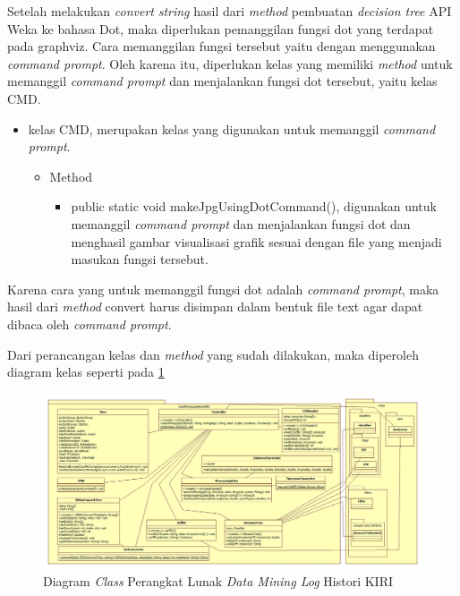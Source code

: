 Setelah melakukan \textsl{convert} \textsl{string} hasil dari \textsl{method} pembuatan \textsl{decision tree} API Weka ke bahasa Dot, maka diperlukan pemanggilan fungsi dot yang terdapat pada graphviz. Cara memanggilan fungsi tersebut yaitu dengan menggunakan \textsl{command prompt}. Oleh karena itu, diperlukan kelas yang memiliki \textsl{method} untuk memanggil \textsl{command prompt} dan menjalankan fungsi dot tersebut, yaitu kelas CMD.


\begin{itemize}
	\item kelas CMD, merupakan kelas yang digunakan untuk memanggil \textsl{command prompt}.
	\begin{itemize}
		\item Method
		\begin{itemize}
			\item public static void makeJpgUsingDotCommand(), digunakan untuk memanggil \textsl{command prompt} dan menjalankan fungsi dot dan menghasil gambar visualisasi grafik sesuai dengan file yang menjadi masukan fungsi tersebut.
		\end{itemize}
	\end{itemize}
\end{itemize}

Karena cara yang untuk memanggil fungsi dot adalah \textsl{command prompt}, maka hasil dari \textsl{method} convert harus disimpan dalam bentuk file text agar dapat dibaca oleh \textsl{command prompt}.

Dari perancangan kelas dan \textsl{method} yang sudah dilakukan, maka diperoleh diagram kelas seperti pada \ref{fig:classDiagram2}

\begin{figure}[ht]
\includegraphics[scale=0.47, angle =90]{Gambar/classdiagram2.jpg}
\caption[Diagram \textsl{Class} Perangkat Lunak \textsl{Data Mining Log} Histori KIRI]{Diagram \textsl{Class} Perangkat Lunak \textsl{Data Mining Log} Histori KIRI} 
\label{fig:classDiagram2}
\end{figure}

